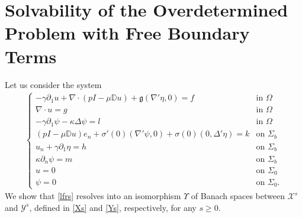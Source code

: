 \documentclass[11pt,letterpaper,reqno]{amsart}
\numberwithin{equation}{section}
\begin{document}
\section{Solvability of the Overdetermined Problem with Free Boundary Terms} \label{welldef}
Let us consider the system
\begin{align} \label{lfrs}
    \begin{cases}
        -\gamma \partial_{1}u + \nabla \cdot (pI-\mu\mathbb{D}u) + \mathfrak{g}(\nabla'\eta,0) = f &\mbox{in \(\Omega\)} \\
        \nabla \cdot u = g &\mbox{in \(\Omega\)} \\
        -\gamma \partial_{1}\psi - \kappa \Delta \psi = l &\mbox{in \(\Omega\)} \\
        (pI-\mu\mathbb{D}u)e_{n} +\sigma'(0)(\nabla'\psi,0)+\sigma(0)(0,\Delta'\eta)=k &\mbox{on \(\Sigma_{b}\)} \\
        u_{n}+\gamma\partial_{1}\eta=h &\mbox{on \(\Sigma_{b}\)} \\
        \kappa\partial_{n}\psi = m &\mbox{on \(\Sigma_{b}\)} \\
        u = 0 &\mbox{on \(\Sigma_{0}\)} \\
        \psi = 0 &\mbox{on \(\Sigma_{0}\)}.
    \end{cases}
\end{align}
We show that \eqref{lfrs} resolves into an isomorphism \(\Upsilon\) of Banach spaces between \(\mathcal{X}^{s}\) and \(\mathcal{Y}^{s}\), defined in \eqref{Xs} and \eqref{Ys}, respectively, for any \(s \geq 0\).
\end{document}
